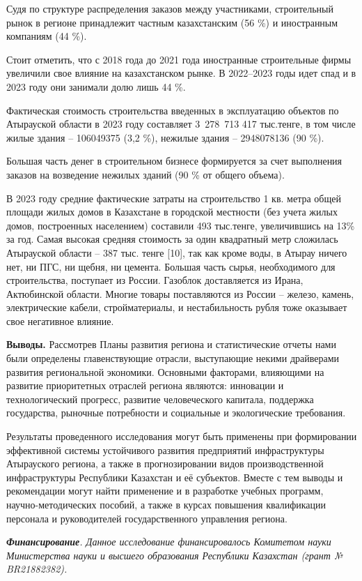 \begin{multicols}{2}
Судя по структуре распределения заказов между участниками, строительный
рынок в регионе принадлежит частным казахстанским (56 \%) и иностранным
компаниям (44 \%).

Стоит отметить, что с 2018 года до 2021 года иностранные строительные
фирмы увеличили свое влияние на казахстанском рынке. В 2022--2023 годы
идет спад и в 2023 году они занимали долю лишь 44 \%.

Фактическая стоимость строительства введенных в эксплуатацию объектов по
Атырауской области в 2023 году составляет 3~278~713 417 тыс.тенге, в том
числе жилые здания -- 106049375 (3,2 \%), нежилые здания -- 2948078136
(90 \%).

Большая часть денег в строительном бизнесе формируется за счет
выполнения заказов на возведение нежилых зданий (90 \% от общего
объема).

В 2023 году средние фактические затраты на строительство 1 кв. метра
общей площади жилых домов в Казахстане в городской местности (без учета
жилых домов, построенных населением) составили 493 тыс.тенге,
увеличившись на 13\% за год. Самая высокая средняя стоимость за один
квадратный метр сложилась Атырауской области -- 387 тыс. тенге {[}10{]},
так как кроме воды, в Атырау ничего нет, ни ПГС, ни щебня, ни цемента.
Большая часть сырья, необходимого для строительства, поступает из
России. Газоблок доставляется из Ирана, Актюбинской области. Многие
товары поставляются из России -- железо, камень, электрические кабели,
стройматериалы, и нестабильность рубля тоже оказывает свое негативное
влияние.

{\bfseries Выводы.} Рассмотрев Планы развития региона и статистические
отчеты нами были определены главенствующие отрасли, выступающие некими
драйверами развития региональной экономики. Основными факторами,
влияющими на развитие приоритетных отраслей региона являются: инновации
и технологический прогресс, развитие человеческого капитала, поддержка
государства, рыночные потребности и социальные и экологические
требования.

Результаты проведенного исследования могут быть применены при
формировании эффективной системы устойчивого развития предприятий
инфраструктуры Атырауского региона, а также в прогнозировании видов
производственной инфраструктуры Республики Казахстан и её субъектов.
Вместе с тем выводы и рекомендации могут найти применение и в разработке
учебных программ, научно-методических пособий, а также в курсах
повышения квалификации персонала и руководителей государственного
управления региона.

\emph{{\bfseries Финансирование}. Данное исследование финансировалось
Комитетом науки Министерства науки и высшего образования Республики
Казахстан (грант № BR21882382).}
\end{multicols}

